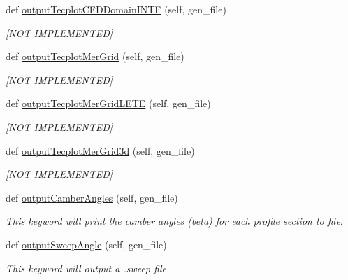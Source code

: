 \begin{DoxyCompactItemize}
def \hyperlink{classbladepro__modules_1_1inputfile__writer_1_1_input_writer_window_ab3fe3d49e2e140068cb5b3b25964919f}{output\+Tecplot\+C\+F\+D\+Domain\+I\+N\+TF} (self, gen\+\_\+file)
\begin{DoxyCompactList}\small\item\em \mbox{[}N\+OT I\+M\+P\+L\+E\+M\+E\+N\+T\+ED\mbox{]} \end{DoxyCompactList}\item 
def \hyperlink{classbladepro__modules_1_1inputfile__writer_1_1_input_writer_window_a735d8bff1d58f17130859af0f97dfbd7}{output\+Tecplot\+Mer\+Grid} (self, gen\+\_\+file)
\begin{DoxyCompactList}\small\item\em \mbox{[}N\+OT I\+M\+P\+L\+E\+M\+E\+N\+T\+ED\mbox{]} \end{DoxyCompactList}\item 
def \hyperlink{classbladepro__modules_1_1inputfile__writer_1_1_input_writer_window_a504ccb848106dd7a0a4148941e2ec6d9}{output\+Tecplot\+Mer\+Grid\+L\+E\+TE} (self, gen\+\_\+file)
\begin{DoxyCompactList}\small\item\em \mbox{[}N\+OT I\+M\+P\+L\+E\+M\+E\+N\+T\+ED\mbox{]} \end{DoxyCompactList}\item 
def \hyperlink{classbladepro__modules_1_1inputfile__writer_1_1_input_writer_window_a4ea4c17b862c49ad9c51398fa9d60dbc}{output\+Tecplot\+Mer\+Grid3d} (self, gen\+\_\+file)
\begin{DoxyCompactList}\small\item\em \mbox{[}N\+OT I\+M\+P\+L\+E\+M\+E\+N\+T\+ED\mbox{]} \end{DoxyCompactList}\item 
def \hyperlink{classbladepro__modules_1_1inputfile__writer_1_1_input_writer_window_ab5d0d97e4bf1dd0ddf28f4f537fea598}{output\+Camber\+Angles} (self, gen\+\_\+file)
\begin{DoxyCompactList}\small\item\em This keyword will print the camber angles (beta) for each profile section to file. \end{DoxyCompactList}\item 
def \hyperlink{classbladepro__modules_1_1inputfile__writer_1_1_input_writer_window_a9d8a631853a80acf18ab0d1c05a11dec}{output\+Sweep\+Angle} (self, gen\+\_\+file)
\begin{DoxyCompactList}\small\item\em This keyword will output a .sweep file. \end{DoxyCompactList}\item 

\end{DoxyCompactItemize}
